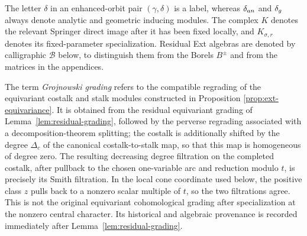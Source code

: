 \documentclass[10pt,a4paper]{amsart}
\begin{document}
The letter $\delta$ in an enhanced-orbit pair $(\gamma,\delta)$ is a label,
whereas $\delta_{\rm an}$ and $\delta_{\rm g}$ always denote analytic and
geometric inducing modules.  The complex $K$ denotes the relevant Springer
direct image after it has been fixed locally, and $K_{\sigma,r}$ denotes its
fixed-parameter specialization.  Residual Ext algebras are denoted by
calligraphic $\mathcal B$ below, to distinguish them from the Borels
$B^\pm$ and from the matrices in the appendices.

The term \emph{Grojnowski grading} refers to the compatible regrading of the
equivariant costalk and stalk modules constructed in Proposition
\ref{prop:ext-equivariance}.  It is obtained from the residual equivariant
grading of Lemma~\ref{lem:residual-grading}, followed by the perverse
regrading associated with a decomposition-theorem splitting; the costalk is
additionally shifted by the degree $\Delta_c$ of the canonical
costalk-to-stalk map, so that this map is homogeneous of degree zero.  The
resulting decreasing degree filtration on the completed costalk, after
pullback to the chosen one-variable arc and reduction modulo $t$, is
precisely its Smith filtration.  In the local cone coordinate used below,
the positive class $z$ pulls back to a nonzero scalar multiple of $t$, so
the two filtrations agree.  This is not the original equivariant
cohomological grading after specialization at the nonzero central character.
Its historical and algebraic provenance is recorded immediately after
Lemma~\ref{lem:residual-grading}.
\end{document}
